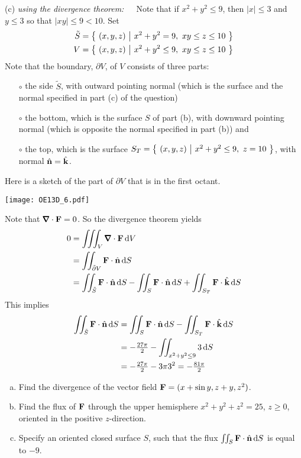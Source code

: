 \begin{solution}
\noindent (c) \emph{ using the divergence theorem:}\ \ \ 
Note that if $x^2+y^2\le 9$, then $|x|\le 3$ and $y\le 3$ so
that $|xy|\le 9<10$. Set
\begin{align*}
\tilde S&=\big\{ \ (x,y,z)\ \big|\  x^2+y^2 = 9,\ xy\le z\le 10\ \big\} \\
V&=\big\{ \ (x,y,z)\ \big|\  x^2+y^2\le 9,\ xy\le z\le 10\ \big\}
\end{align*}
Note that the boundary, $\partial V$,  of $V$ consists of three parts:
\begin{itemize}\itemsep1pt \parskip0pt \parsep0pt %
\item[$\circ$]
the side $\tilde S$, with outward pointing normal (which is the surface and
the normal specified in part (c) of the question)
\item[$\circ$]
the bottom, which is the surface $S$ of part (b), with downward pointing
normal (which is opposite the normal specified in part (b)) and 
\item[$\circ$]
the top, which is the surface $S_T=\big\{ \ (x,y,z)\ \big|\ x^2+y^2\le 9,\ z=10\ \big\}$,
with normal $\hat{\mathbf{n}}=\hat{\mathbf{k}}$.
\end{itemize} 
Here is a sketch of the part of $\partial V$ that is in the first octant.

\begin{center}
       \texttt{[image: OE13D\_6.pdf]}
\end{center}

\noindent
Note that $\vnabla\cdot\vF=0$. So the divergence theorem yields
\begin{align*}
0&=\tripInt_V \vnabla\cdot \vF\,\dee{V} \\
&=\dblInt_{\tilde \partial V} \vF\cdot\hn\,\dee{S} \\
&=\dblInt_{\tilde S} \vF\cdot\hn\,\dee{S}
   -\dblInt_{S} \vF\cdot\hn\,\dee{S}
   +\dblInt_{S_T} \vF\cdot\hk\,\dee{S} \\
\end{align*}
This implies
\begin{align*}
\iint_{\tilde S} \mathbf{F}\cdot\hat{\mathbf{n}}\,\mathrm{d}S
&=\iint_{S} \mathbf{F}\cdot\hat{\mathbf{n}}\,\mathrm{d}S
   -\iint_{S_T} \mathbf{F}\cdot\hat{\mathbf{k}}\,\mathrm{d}S \\
&=-\tfrac{27\pi}{2} -\iint_{x^2+y^2\le 9} 3\,\mathrm{d}S \\
&= -\tfrac{27\pi}{2} -3 \pi 3^2
=-\tfrac{81\pi}{2}
\end{align*}
\end{solution}


\begin{question}[M317 2013D] %

\begin{enumerate}[(a)]
\item
Find the divergence of the vector field $\mathbf{F}  = (x + \sin y, z + y, z^2)$.
\item
Find the flux of $\mathbf{F}$ through the upper hemisphere $x^2 + y^2 + z^2 = 25$, 
$z \ge 0$, oriented in the positive $z$-direction.
\item
Specify an oriented closed surface $S$, such that the flux 
$\iint_S\mathbf{F} \cdot\hat{\mathbf{n}}\,\mathrm{d}S$ is equal to $-9$.
\end{enumerate}
\end{question}

